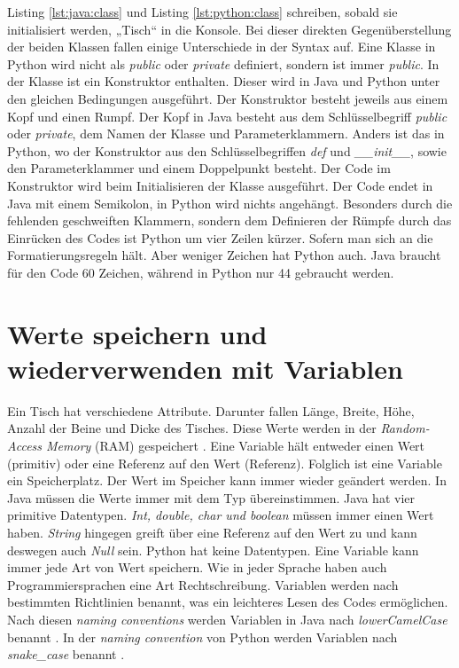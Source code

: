 Listing \ref{lst:java:class} und Listing \ref{lst:python:class} schreiben, sobald sie initialisiert werden, „Tisch“ in die Konsole. Bei dieser direkten Gegenüberstellung der beiden Klassen fallen einige Unterschiede in der Syntax auf. Eine Klasse in Python wird nicht als \textit{public} oder \textit{private} definiert, sondern ist immer \textit{public}. In der Klasse ist ein Konstruktor enthalten. Dieser wird in Java und Python unter den gleichen Bedingungen ausgeführt. Der Konstruktor besteht jeweils aus einem Kopf und einen Rumpf. Der Kopf in Java besteht aus dem Schlüsselbegriff \textit{public} oder \textit{private}, dem Namen der Klasse und Parameterklammern. Anders ist das in Python, wo der Konstruktor aus den Schlüsselbegriffen \textit{def} und \textit{\_\_init\_\_}, sowie den Parameterklammer und einem Doppelpunkt besteht. Der Code im Konstruktor wird beim Initialisieren der Klasse ausgeführt. Der Code endet in Java mit einem Semikolon, in Python wird nichts angehängt. Besonders durch die fehlenden geschweiften Klammern, sondern dem Definieren der Rümpfe durch das Einrücken des Codes ist Python um vier Zeilen kürzer. Sofern man sich an die Formatierungsregeln hält. Aber weniger Zeichen hat Python auch. Java braucht für den Code 60 Zeichen, während in Python nur 44 gebraucht werden. \par

\section{Werte speichern und wiederverwenden mit Variablen}
Ein Tisch hat verschiedene Attribute. Darunter fallen Länge, Breite, Höhe, Anzahl der Beine und Dicke des Tisches. Diese Werte werden in der \textit{Random-Access Memory} (RAM) gespeichert \cite{Louis:2010}. Eine Variable hält entweder einen Wert (primitiv) oder eine Referenz auf den Wert (Referenz). Folglich ist eine Variable ein Speicherplatz. Der Wert im Speicher kann immer wieder geändert werden. In Java müssen die Werte immer mit dem Typ übereinstimmen. Java hat vier primitive Datentypen. \textit{Int, double, char und boolean} müssen immer einen Wert haben. \textit{String} hingegen greift über eine Referenz auf den Wert zu und kann deswegen auch \textit{Null} sein. Python hat keine Datentypen. Eine Variable kann immer jede Art von Wert speichern. Wie in jeder Sprache haben auch Programmiersprachen eine Art Rechtschreibung. Variablen werden nach bestimmten Richtlinien benannt, was ein leichteres Lesen des Codes ermöglichen. Nach diesen \textit{naming conventions} werden Variablen in Java nach \textit{lowerCamelCase} benannt \cite{Microsoft:CapCon}. In der \textit{naming convention} von Python werden Variablen nach \textit{snake\_case} benannt \cite{Ims:h-s}. \cite{JavaNC}\cite{PythonStyle}\cite{JVMS}

